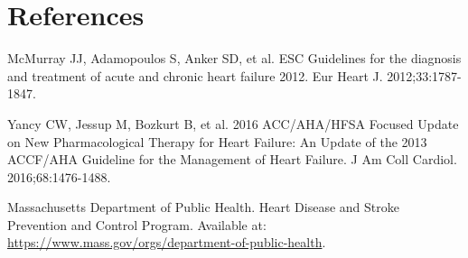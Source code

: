 \documentclass{article}
\begin{document}
\section{References}

\begin{thebibliography}{9}
McMurray JJ, Adamopoulos S, Anker SD, et al. ESC Guidelines for the diagnosis and treatment of acute and chronic heart failure 2012. Eur Heart J. 2012;33:1787-1847.

Yancy CW, Jessup M, Bozkurt B, et al. 2016 ACC/AHA/HFSA Focused Update on New Pharmacological Therapy for Heart Failure: An Update of the 2013 ACCF/AHA Guideline for the Management of Heart Failure. J Am Coll Cardiol. 2016;68:1476-1488.

Massachusetts Department of Public Health. Heart Disease and Stroke Prevention and Control Program. Available at: \url{https://www.mass.gov/orgs/department-of-public-health}.
\end{thebibliography}
\end{document}
